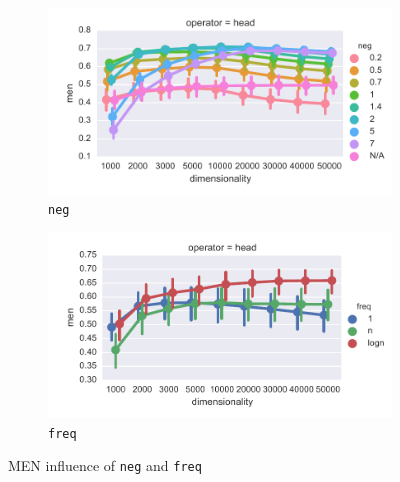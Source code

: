 \begin{figure}[b]
  \centering

  \begin{subfigure}[t]{0.49\textwidth}
    \includegraphics[width=\textwidth]{supplement/figures/men-interaction-neg}

  \caption{\texttt{neg}}
  \label{fig:men-neg}
  \end{subfigure}
  \begin{subfigure}[t]{0.49\textwidth}
    \includegraphics[width=\textwidth]{supplement/figures/men-interaction-freq}

  \caption{\texttt{freq}}
  \label{fig:men-freq}
  \end{subfigure}

  \caption{MEN influence of \texttt{neg} and \texttt{freq}}
\end{figure}
